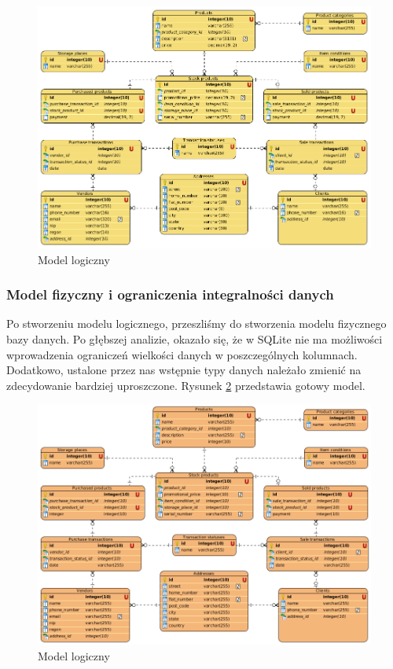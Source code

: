 \begin{figure}[h]
	\centering
	\includegraphics[width=1\linewidth]{images/image2.png}
	\caption{Model logiczny}
	\label{image2}
\end{figure}

\newpage
\subsubsection{Model fizyczny i ograniczenia integralności danych}

Po stworzeniu modelu logicznego, przeszliśmy do stworzenia modelu fizycznego bazy danych. Po głębszej analizie, okazało się, że w SQLite nie ma możliwości wprowadzenia ograniczeń wielkości danych w poszczególnych kolumnach. Dodatkowo, ustalone przez nas wstępnie typy danych należało zmienić na zdecydowanie bardziej uproszczone. Rysunek \ref{image3} przedstawia gotowy model.

\begin{figure}[h]
	\centering
	\includegraphics[width=1\linewidth]{images/image3.png}
	\caption{Model logiczny}
	\label{image3}
\end{figure}

